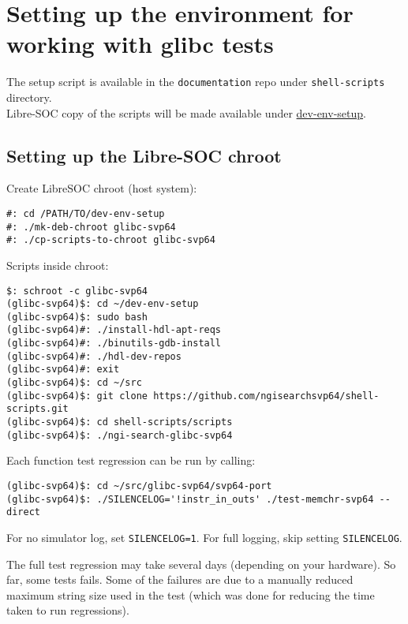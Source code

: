 %

\chapter{Setting up the environment for working with glibc tests}

The setup script is available in the \texttt{documentation} repo
under \texttt{shell-scripts} directory.\\

Libre-SOC copy of the scripts will be made available under
\href{https://git.libre-soc.org/?p=dev-env-setup.git;a=tree}{dev-env-setup}.

\section{Setting up the Libre-SOC chroot}

Create LibreSOC chroot (host system):

\begin{verbatim}
#: cd /PATH/TO/dev-env-setup
#: ./mk-deb-chroot glibc-svp64
#: ./cp-scripts-to-chroot glibc-svp64
\end{verbatim}

Scripts inside chroot:

\begin{verbatim}
$: schroot -c glibc-svp64
(glibc-svp64)$: cd ~/dev-env-setup
(glibc-svp64)$: sudo bash
(glibc-svp64)#: ./install-hdl-apt-reqs
(glibc-svp64)#: ./binutils-gdb-install
(glibc-svp64)#: ./hdl-dev-repos
(glibc-svp64)#: exit
(glibc-svp64)$: cd ~/src
(glibc-svp64)$: git clone https://github.com/ngisearchsvp64/shell-scripts.git
(glibc-svp64)$: cd shell-scripts/scripts
(glibc-svp64)$: ./ngi-search-glibc-svp64
\end{verbatim}

Each function test regression can be run by calling:

\begin{verbatim}
(glibc-svp64)$: cd ~/src/glibc-svp64/svp64-port
(glibc-svp64)$: ./SILENCELOG='!instr_in_outs' ./test-memchr-svp64 --direct
\end{verbatim}

For no simulator log, set \texttt{SILENCELOG=1}.
For full logging, skip setting \texttt{SILENCELOG}.

The full test regression may take several days (depending on your hardware).
So far, some tests fails. Some of the failures are due to a manually reduced
maximum string size used in the test (which was done for reducing the time
taken to run regressions).\\

